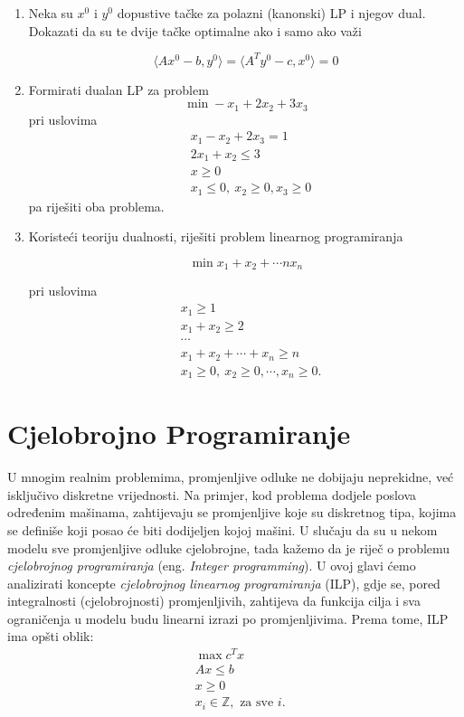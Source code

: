 \documentclass[a4paper, utf8, 11pt, colorlinks]{book}
\theoremstyle{definition}
\begin{document}
\begin{enumerate}
\item Neka su $x^0$ i $y^0$ dopustive tačke za polazni (kanonski) LP i njegov dual. Dokazati da su te dvije tačke optimalne ako i samo ako važi 

$$\langle Ax^0-b,y^0\rangle=\langle A^Ty^0-c,x^0\rangle=0$$

\item Formirati dualan LP za problem
$$\min -x_1+2x_2+3x_3$$
pri uslovima
\begin{align}
	& x_1-x_2+2x_3=1\nonumber\\
	& 2x_1+x_2\leqslant 3\nonumber \\
	& x \geq 0\nonumber \\
	& x_1\leqslant 0,\ x_2\geqslant 0, x_3\geqslant 0 \nonumber
\end{align}
pa riješiti oba problema.

\item Koristeći teoriju dualnosti, riješiti problem linearnog programiranja

$$\min x_1+x_2+\cdots nx_n$$

pri uslovima
$$
\begin{aligned}
	& x_1\geqslant 1\\
	& x_1+x_2\geqslant 2 \\
	& \cdots\\
	& x_1+x_2+\cdots+x_n\geqslant n\\
	&x_1\geqslant 0,\ x_2\geqslant 0,\cdots,x_n\geqslant 0.
\end{aligned}$$
\end{enumerate}
\chapter{Cjelobrojno Programiranje}

U mnogim realnim problemima, promjenljive odluke ne dobijaju neprekidne, već isključivo diskretne vrijednosti. Na primjer, kod problema dodjele poslova određenim mašinama, zahtijevaju se promjenljive koje su diskretnog tipa, kojima se definiše koji posao će biti dodijeljen kojoj mašini. U slučaju da su u nekom modelu sve promjenljive odluke cjelobrojne, tada kažemo da je riječ o problemu \emph{cjelobrojnog programiranja} (eng. \emph{Integer programming}). 
U ovoj glavi ćemo analizirati koncepte   \emph{cjelobrojnog linearnog programiranja} (ILP), gdje se, pored integralnosti (cjelobrojnosti) promjenljivih, zahtijeva da funkcija cilja  i sva ograničenja u modelu budu linearni izrazi po promjenljivima. Prema tome, ILP ima opšti oblik:
\begin{align}
    & \max c^T x \nonumber\\
    & A x \leq b \nonumber \\
    & x \geq 0 \nonumber\\
    & x_i \in \mathbb{Z}, \mbox{ za sve } i. \label{ilp-formulation}
\end{align}
\end{document}
